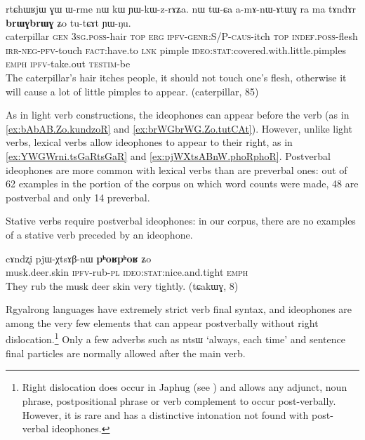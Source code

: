 \documentclass[oldfontcommands,oneside,a4paper,11pt]{article}
\newcommand{\ipa}[1]{{\phon \mbox{#1}}} %
\begin{document}
\begin{exe}
\ex \label{ex:brWGbrWG.Zo.tutCAt}
\gll
\ipa{rtɕhɯʁjɯ}  	\ipa{ɣɯ}  	\ipa{ɯ-rme}  	\ipa{nɯ}  	\ipa{kɯ}  	\ipa{ɲɯ-kɯ-z-rɤʑa.}  	\ipa{nɯ}  	\ipa{tɯ-ɕa}  	\ipa{a-mɤ-nɯ-ɤtɯɣ}  	\ipa{ra}  	\ipa{ma}  	\ipa{tɤndɤr}  	\ipa{\textbf{brɯɣbrɯɣ}}  	\ipa{ʑo}  	\ipa{tu-tɕɤt}  	\ipa{ɲɯ-ŋu.}  \\
caterpillar \textsc{gen} \textsc{3sg.poss}-hair \textsc{top} \textsc{erg} \textsc{ipfv-genr:S/P-caus}-itch \textsc{top} \textsc{indef.poss}-flesh \textsc{irr-neg-pfv}-touch \textsc{fact}:have.to \textsc{lnk} pimple \textsc{ideo:stat}:covered.with.little.pimples \textsc{emph} \textsc{ipfv}-take.out \textsc{testim}-be \\
\glt The caterpillar's hair itches people, it should not touch one's flesh, otherwise it will cause a lot of little pimples to appear. (caterpillar, 85)
\end{exe}

As in light verb constructions, the ideophones can appear  before the verb (as in \ref{ex:bAbAB.Zo.kundzoR} and \ref{ex:brWGbrWG.Zo.tutCAt}). However, unlike light verbs, lexical verbs allow ideophones to appear to their right, as in \ref{ex:YWGWrni.tsGaRtsGaR} and \ref{ex:pjWXtsABnW.phoRphoR}. Postverbal ideophones are more common with lexical verbs than are preverbal ones: out of 62 examples in the portion of the corpus on which word counts were made, 48 are postverbal and only 14 preverbal. 

Stative verbs require postverbal ideophones: in our corpus, there are no examples of a stative verb preceded by an ideophone. 


 \begin{exe}
\ex \label{ex:pjWXtsABnW.phoRphoR}
\gll 
\ipa{cɤndʐi}  	\ipa{pjɯ-χtsɤβ-nɯ}  	\ipa{\textbf{pʰoʁpʰoʁ}} \ipa{ʑo}\\
musk.deer.skin \textsc{ipfv}-rub-\textsc{pl} \textsc{ideo:stat}:nice.and.tight \textsc{emph}\\
\glt They rub the musk deer skin very tightly. (tɕakɯɣ, 8)
\end{exe}

Rgyalrong languages have extremely strict verb final syntax, and ideophones are among the very few elements that can appear  postverbally without right dislocation.\footnote{Right dislocation does occur in Japhug (see \citealt[207-8]{jacques13harmonization}) and allows any adjunct, noun phrase, postpositional phrase or verb complement to occur post-verbally. However, it is rare and has a distinctive intonation not found with post-verbal ideophones.} Only a few adverbs such as \ipa{ntsɯ} `always, each time' and sentence final particles are normally allowed after the main verb. 
\end{document}
